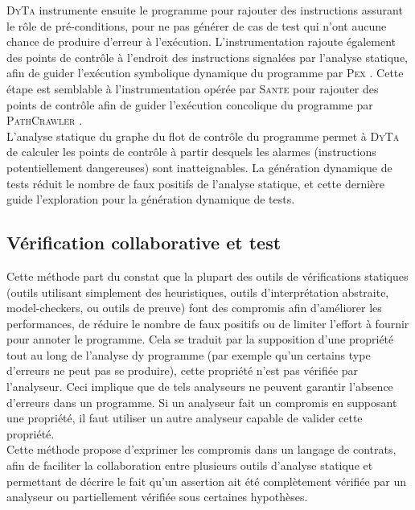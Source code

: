 \textsc{DyTa} instrumente ensuite le programme pour rajouter des instructions
assurant le rôle de pré-conditions, pour ne pas générer de cas de test qui n'ont
aucune chance de produire d'erreur à l'exécution. L'instrumentation rajoute
également des points de contrôle à l'endroit des instructions signalées par
l'analyse statique, afin de guider l'exécution symbolique dynamique du programme
par \textsc{Pex} \cite{PEX}. Cette étape est semblable à l'instrumentation
opérée par \textsc{Sante} \cite{SANTE} pour rajouter des points de contrôle afin
de guider l'exécution concolique du programme par \textsc{PathCrawler}
\cite{PathCrawler}.\\

L'analyse statique du graphe du flot de contrôle du programme permet à
\textsc{DyTa} de calculer les points de contrôle à partir desquels les alarmes
(instructions potentiellement dangereuses) sont inatteignables. La génération
dynamique de tests réduit le nombre de faux positifs de l'analyse statique, et
cette dernière guide l'exploration pour la génération dynamique de tests.

\subsection{Vérification collaborative et test}

Cette méthode \cite{collaborative-verification} part du constat que la plupart
des outils de vérifications statiques (outils utilisant simplement des
heuristiques, outils d'interprétation abstraite, model-checkers, ou outils de
preuve) font des compromis afin d'améliorer les performances, de réduire le
nombre de faux positifs ou de limiter l'effort à fournir pour annoter le
programme. Cela se traduit par la supposition d'une propriété tout au long de
l'analyse dy programme (par exemple qu'un certains type d'erreurs ne peut pas
se produire), cette propriété n'est pas vérifiée par l'analyseur. Ceci
implique que de tels analyseurs ne peuvent garantir l'absence d'erreurs dans un
programme. Si un analyseur fait un compromis en supposant une propriété, il
faut utiliser un autre analyseur capable de valider cette propriété.\\

Cette méthode propose d'exprimer les compromis dans un langage de contrats,
afin de faciliter la collaboration entre plusieurs outils d'analyse statique
et permettant de décrire le fait qu'un assertion ait été complètement vérifiée
par un analyseur ou partiellement vérifiée sous certaines hypothèses.\\

